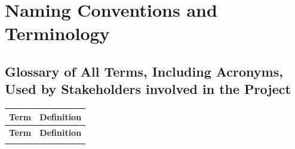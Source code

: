 \documentclass[12pt]{article}
\begin{document}
\section{Naming Conventions and Terminology}
\subsection{Glossary of All Terms, Including Acronyms, Used by Stakeholders
involved in the Project}

\begin{longtable}{|l|p{12cm}|}
\hline
\textbf{Term} & \textbf{Definition} \\ 
\hline
\endfirsthead

\hline
\textbf{Term} & \textbf{Definition} \\ 
\hline
\endhead

\hline
\endfoot

\hline
\endlastfoot


\end{longtable}
\end{document}
